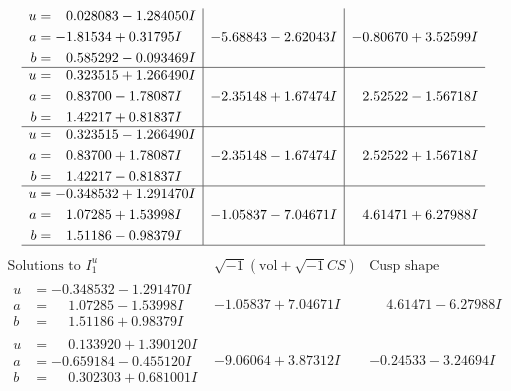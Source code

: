 \documentclass[1p]{elsarticle_modified}
\theoremstyle{definition}
\newcommand{\I}{\sqrt{-1}}
\begin{document}
$$\begin{array}{c|c|c}
\begin{aligned}
u &= \phantom{-}0.028083 - 1.284050 I \\
a &= -1.81534 + 0.31795 I \\
b &= \phantom{-}0.585292 - 0.093469 I\end{aligned}
 & -5.68843 - 2.62043 I & -0.80670 + 3.52599 I \\ \hline\begin{aligned}
u &= \phantom{-}0.323515 + 1.266490 I \\
a &= \phantom{-}0.83700 - 1.78087 I \\
b &= \phantom{-}1.42217 + 0.81837 I\end{aligned}
 & -2.35148 + 1.67474 I & \phantom{-}2.52522 - 1.56718 I \\ \hline\begin{aligned}
u &= \phantom{-}0.323515 - 1.266490 I \\
a &= \phantom{-}0.83700 + 1.78087 I \\
b &= \phantom{-}1.42217 - 0.81837 I\end{aligned}
 & -2.35148 - 1.67474 I & \phantom{-}2.52522 + 1.56718 I \\ \hline\begin{aligned}
u &= -0.348532 + 1.291470 I \\
a &= \phantom{-}1.07285 + 1.53998 I \\
b &= \phantom{-}1.51186 - 0.98379 I\end{aligned}
 & -1.05837 - 7.04671 I & \phantom{-}4.61471 + 6.27988 I\\
 \hline 
 \end{array}$$\newpage$$\begin{array}{c|c|c}  
\text{Solutions to }I^u_{1}& \I (\text{vol} + \sqrt{-1}CS) & \text{Cusp shape}\\
 \hline 
\begin{aligned}
u &= -0.348532 - 1.291470 I \\
a &= \phantom{-}1.07285 - 1.53998 I \\
b &= \phantom{-}1.51186 + 0.98379 I\end{aligned}
 & -1.05837 + 7.04671 I & \phantom{-}4.61471 - 6.27988 I \\ \hline\begin{aligned}
u &= \phantom{-}0.133920 + 1.390120 I \\
a &= -0.659184 - 0.455120 I \\
b &= \phantom{-}0.302303 + 0.681001 I\end{aligned}
 & -9.06064 + 3.87312 I & -0.24533 - 3.24694 I \\ \hline\begin{aligned}

\end{aligned}
\end{array}$$
\end{document}
